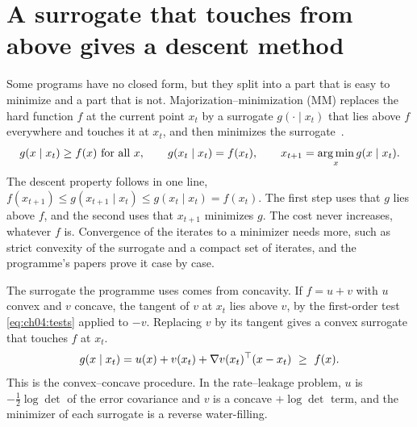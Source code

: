 
\section{A surrogate that touches from above gives a descent method}\label{sec:ch04:mm}

Some programs have no closed form, but they split into a part that is easy to minimize and a part that is not. Majorization--minimization (MM) replaces the hard function $f$ at the current point $x_t$ by a surrogate $g(\cdot\mid x_t)$ that lies above $f$ everywhere and touches it at $x_t$, and then minimizes the surrogate~\cite{hunterlange2004,sun2017}.
\begin{equation}\label{eq:ch04:mm}
g(x\mid x_t)\ge f(x)\ \text{for all }x,\qquad g(x_t\mid x_t)=f(x_t),\qquad x_{t+1}=\operatorname*{arg\,min}_x g(x\mid x_t).
\end{equation}
The descent property follows in one line, $f(x_{t+1})\le g(x_{t+1}\mid x_t)\le g(x_t\mid x_t)=f(x_t)$. The first step uses that $g$ lies above $f$, and the second uses that $x_{t+1}$ minimizes $g$. The cost never increases, whatever $f$ is. Convergence of the iterates to a minimizer needs more, such as strict convexity of the surrogate and a compact set of iterates, and the programme's papers prove it case by case.

The surrogate the programme uses comes from concavity. If $f=u+v$ with $u$ convex and $v$ concave, the tangent of $v$ at $x_t$ lies above $v$, by the first-order test \eqref{eq:ch04:tests} applied to $-v$. Replacing $v$ by its tangent gives a convex surrogate that touches $f$ at $x_t$.
\begin{equation}\label{eq:ch04:ccp}
g(x\mid x_t)=u(x)+v(x_t)+\nabla v(x_t)^{\top}(x-x_t)\ \ge\ f(x).
\end{equation}
This is the convex--concave procedure. In the rate--leakage problem, $u$ is $-\frac12\log\det$ of the error covariance and $v$ is a concave $+\log\det$ term, and the minimizer of each surrogate is a reverse water-filling.


